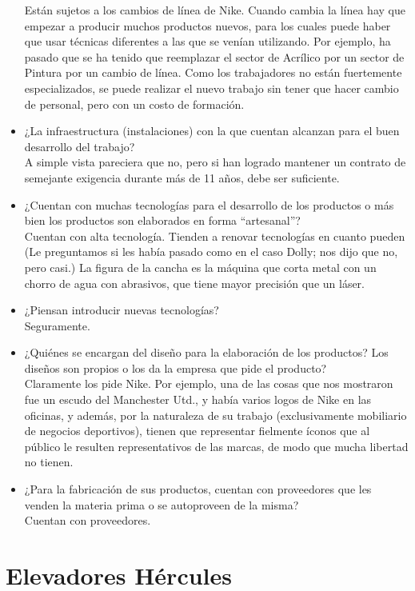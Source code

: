 \documentclass[a4paper,10pt,titlepage]{article}
\begin{document}
\begin{itemize}
Est\'an sujetos a los cambios de l\'inea de Nike. Cuando cambia la l\'inea hay que empezar a producir muchos productos nuevos,
 para los cuales puede haber que usar t\'ecnicas diferentes a las que se ven\'ian utilizando. 
Por ejemplo, ha pasado que se ha tenido que reemplazar el sector de Acr\'ilico por un sector de Pintura por un cambio de l\'inea. 
Como los trabajadores no est\'an fuertemente especializados, se puede realizar el nuevo trabajo sin tener que hacer cambio de personal, pero con un costo de formaci\'on.
\item ¿La infraestructura (instalaciones) con la que cuentan alcanzan para el buen desarrollo del trabajo? \\
 A simple vista pareciera que no, pero si han logrado mantener un contrato de semejante exigencia durante m\'as de 11 años, debe ser suficiente.
\item ¿Cuentan con muchas tecnolog\'ias para el desarrollo de los productos o m\'as bien los productos son elaborados en forma ``artesanal''? \\
Cuentan con alta tecnolog\'ia. Tienden a renovar tecnolog\'ias en cuanto pueden (Le preguntamos si les hab\'ia pasado como en el caso Dolly; nos dijo que no, pero casi.) La figura de la cancha es la m\'aquina que corta metal con un chorro de agua con abrasivos, que tiene mayor precisi\'on que un l\'aser.
\item ¿Piensan introducir nuevas tecnolog\'ias? \\
Seguramente.
\item ¿Qui\'enes se encargan del diseño para la elaboraci\'on de los productos? Los diseños son propios o los da la empresa que pide el producto? \\
Claramente los pide Nike. Por ejemplo, una de las cosas que nos mostraron fue un escudo del Manchester Utd., y hab\'ia varios logos de Nike en las oficinas, 
y adem\'as, por la naturaleza de su trabajo (exclusivamente mobiliario de negocios deportivos), tienen que representar fielmente \'iconos que al p\'ublico le resulten 
representativos de las marcas, de modo que mucha libertad no tienen.
\item ¿Para la fabricaci\'on de sus productos, cuentan con proveedores que les venden la materia prima o se autoproveen de la misma? \\
Cuentan con proveedores. 

\end{itemize}

\newpage
\section{Elevadores H\'ercules}
\end{document}
